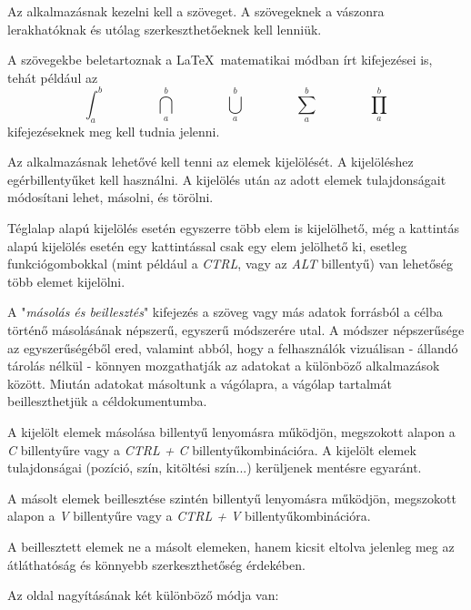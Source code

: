 
Az alkalmazásnak kezelni kell a szöveget. A szövegeknek a vászonra lerakhatóknak és utólag szerkeszthetőeknek kell lenniük. 

A szövegekbe beletartoznak a \LaTeX\ matematikai módban írt kifejezései is, tehát például az $$ \int_{a}^{b} \qquad\qquad \bigcap_{a}^{b} \qquad\qquad \bigcup_{a}^{b} \qquad\qquad \sum_{a}^{b} \qquad\qquad \prod_{a}^{b}$$ kifejezéseknek meg kell tudnia jelenni.


Az alkalmazásnak lehetővé kell tenni az elemek kijelölését. A kijelöléshez egérbillentyűket kell használni. A kijelölés után az adott elemek tulajdonságait módosítani lehet, másolni, és törölni. 

 Téglalap alapú kijelölés esetén egyszerre több elem is kijelölhető, még a kattintás alapú kijelölés esetén egy kattintással csak egy elem jelölhető ki, esetleg funkciógombokkal (mint például a \textit{CTRL}, vagy az \textit{ALT} billentyű) van lehetőség több elemet kijelölni.


A "\textit{másolás és beillesztés}" kifejezés a szöveg vagy más adatok forrásból a célba történő másolásának népszerű, egyszerű módszerére utal. A módszer népszerűsége az egyszerűségéből ered, valamint abból, hogy a felhasználók vizuálisan - állandó tárolás nélkül - könnyen mozgathatják az adatokat a különböző alkalmazások között. Miután adatokat másoltunk a vágólapra, a vágólap tartalmát beilleszthetjük a céldokumentumba.


A kijelölt elemek másolása billentyű lenyomásra működjön, megszokott alapon a \textit{C} billentyűre vagy a \textit{CTRL + C} billentyűkombinációra. A kijelölt elemek tulajdonságai (pozíció, szín, kitöltési szín...) kerüljenek mentésre egyaránt. 


A másolt elemek beillesztése szintén billentyű lenyomásra működjön, megszokott alapon a \textit{V} billentyűre vagy a \textit{CTRL + V} billentyűkombinációra. 

A beillesztett elemek ne a másolt elemeken, hanem kicsit eltolva jelenleg meg az átláthatóság és könnyebb szerkeszthetőség érdekében.


Az oldal nagyításának két különböző módja van:

